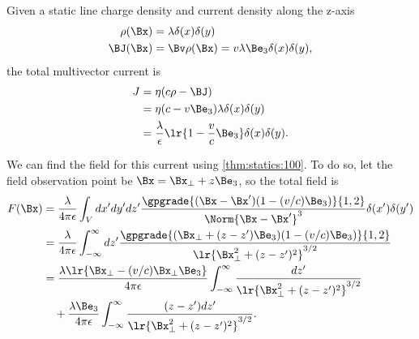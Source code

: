 %
%

Given a static line charge density and current density along the z-axis
\begin{equation}\label{eqn:statics_infiniteLineCharge:120}
\begin{aligned}
\rho(\Bx) &= \lambda \delta(x) \delta(y) \\
\BJ(\Bx) &= \Bv \rho(\Bx) = v \lambda \Be_3 \delta(x) \delta(y),
\end{aligned}
\end{equation}
the total multivector current is
\begin{equation}\label{eqn:statics_infiniteLineCharge:140}
\begin{aligned}
J
&= \eta ( c \rho - \BJ ) \\
&= \eta ( c - v \Be_3 ) \lambda \delta(x) \delta(y) \\
&= \frac{\lambda}{\epsilon} \lr{ 1 - \frac{v}{c} \Be_3 } \delta(x) \delta(y).
\end{aligned}
\end{equation}

We can find the field for this current using
\cref{thm:statics:100}.
To do so, let the field observation point be \( \Bx = \Bx_\perp + z \Be_3 \), so the total field is
\begin{equation}\label{eqn:statics_infiniteLineCharge:160}
\begin{aligned}
F(\Bx)
&= \frac{\lambda}{4\pi \epsilon} \int_V dx'dy'dz' \frac{\gpgrade{(\Bx - \Bx') (1 - (v/c) \Be_3 )}{1,2}}{\Norm{\Bx - \Bx'}^3} \delta(x') \delta(y') \\
&= \frac{\lambda}{4\pi \epsilon} \int_{-\infty}^\infty dz' \frac{\gpgrade{(\Bx_\perp + (z - z') \Be_3) (1 - (v/c) \Be_3 )}{1,2}}{\lr{\Bx_\perp^2 + (z-z')^2}^{3/2}} \\
&=
\frac{\lambda \lr{ \Bx_\perp - (v/c) \Bx_\perp \Be_3}}{4\pi \epsilon} \int_{-\infty}^\infty \frac{dz'}{\lr{\Bx_\perp^2 + (z-z')^2}^{3/2}} \\
&\quad +
\frac{\lambda \Be_3}{4\pi \epsilon} \int_{-\infty}^\infty \frac{(z - z') dz'}{\lr{\Bx_\perp^2 + (z-z')^2}^{3/2}}.
\end{aligned}
\end{equation}

